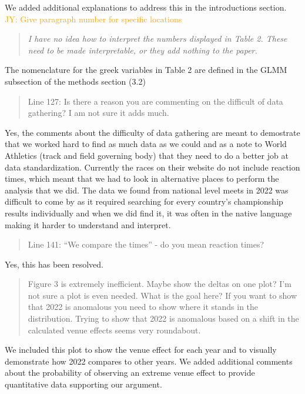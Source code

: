 \documentclass[12pt]{article}
\newcommand{\jy}[1]{\textcolor{orange}{JY: #1}}
\newenvironment{comment}%
{\begin{quotation}\noindent\small\it\color{darkblue}\ignorespaces%
}{\end{quotation}}
\begin{document}
We added additional explanations to address this in the introductions section.
\jy{Give paragraph number for specific locations}

\begin{comment}I have no idea how to interpret the numbers displayed in Table 2. These
need to be made interpretable, or they add nothing to the paper.
\end{comment}

The nomenclature for the greek variables in Table 2 are defined in the GLMM
subsection of the methods section (3.2)

\begin{comment}
Line 127: Is there a reason you are commenting on the difficult of data
gathering? I am not sure it adds much.
\end{comment}

Yes, the comments about the difficulty of data gathering are meant to demostrate
that we worked hard to find as much data as we could and as a note to World
Athletics (track and field governing body) that they need to do a better job
at data standardization.  Currently the races on their website do not include
reaction times, which meant that we had to look in alternative places to perform
the analysis that we did.  The data we found from national level meets in 2022
was difficult to come by as it required searching for every country's championship
results individually and when we did find it, it was often in the native language
making it harder to understand and interpret.

\begin{comment}
Line 141: “We compare the times” - do you mean reaction times?
\end{comment}

Yes, this has been resolved.

\begin{comment}
Figure 3 is extremely inefficient. Maybe show the deltas on one plot? I'm not
sure a plot is even needed. What is the goal here? If you want to show that 2022
is anomalous you need to show where it stands in the distribution. Trying to
show that 2022 is anomalous based on a shift in the calculated venue effects
seems very roundabout.
\end{comment}

We included this plot to show the venue effect for each year and to visually
demonstrate how 2022 compares to other years.  We added additional comments
about the probability of observing an extreme venue effect to provide
quantitative data supporting our argument.
\end{document}
